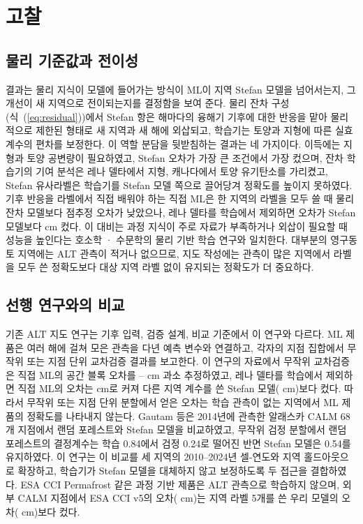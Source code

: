 \section{고찰}\label{sec:discussion}

\subsection{물리 기준값과 전이성}
결과는 물리 지식이 모델에 들어가는 방식이 ML이 지역 Stefan 모델을 넘어서는지, 그 개선이 새 지역으로 전이되는지를 결정함을 보여 준다. 물리 잔차 구성(식~(\ref{eq:residual}))에서 Stefan 항은 해마다의 융해기 기후에 대한 반응을 맡아 물리적으로 제한된 형태로 새 지역과 새 해에 외삽되고, 학습기는 토양과 지형에 따른 실효 계수의 편차를 보정한다. 이 역할 분담을 뒷받침하는 결과는 네 가지이다. 이득에는 지형과 토양 공변량이 필요하였고, Stefan 오차가 가장 큰 조건에서 가장 컸으며, 잔차 학습기의 기여 분석은 레나 델타에서 지형, 캐나다에서 토양 유기탄소를 가리켰고, Stefan 유사라벨은 학습기를 Stefan 모델 쪽으로 끌어당겨 정확도를 높이지 못하였다. 기후 반응을 라벨에서 직접 배워야 하는 직접 ML은 한 지역의 라벨을 모두 쓸 때 물리 잔차 모델보다 점추정 오차가 낮았으나, 레나 델타를 학습에서 제외하면 오차가 Stefan 모델보다 \ndrefLeregDzabs{} cm 컸다. 이 대비는 과정 지식이 주로 자료가 부족하거나 외삽이 필요할 때 성능을 높인다는 호소학 · 수문학의 물리 기반 학습 연구와 일치한다\cite{Read2019,Jia2021,Willard2022}. 대부분의 영구동토 지역에는 ALT 관측이 적거나 없으므로, 지도 작성에는 관측이 많은 지역에서 라벨을 모두 쓴 정확도보다 대상 지역 라벨 없이 유지되는 정확도가 더 중요하다.

\subsection{선행 연구와의 비교}
기존 ALT 지도 연구는 기후 입력, 검증 설계, 비교 기준에서 이 연구와 다르다. ML 제품은 여러 해에 걸쳐 모은 관측을 다년 예측 변수와 연결하고, 각자의 지점 집합에서 무작위 또는 지점 단위 교차검증 결과를 보고한다\cite{Ran2022a,Liu2024,Wei2026}. 이 연구의 자료에서 무작위 교차검증은 직접 ML의 공간 블록 오차를 \noptimLeDz--\noptimCaDz{} cm 과소 추정하였고, 레나 델타를 학습에서 제외하면 직접 ML의 오차는 \nrmseLeregDz{} cm로 커져 다른 지역 계수를 쓴 Stefan 모델(\nrmseLeregPz{} cm)보다 컸다. 따라서 무작위 또는 지점 단위 분할에서 얻은 오차는 학습 관측이 없는 지역에서 ML 제품의 정확도를 나타내지 않는다. Gautam 등\cite{Gautam2025}은 2014년에 관측한 알래스카 CALM 68개 지점에서 랜덤 포레스트와 Stefan 모델을 비교하였고, 무작위 검정 분할에서 랜덤 포레스트의 결정계수는 학습 0.84에서 검정 0.24로 떨어진 반면 Stefan 모델은 0.54를 유지하였다. 이 연구는 이 비교를 세 지역의 2010--2024년 셀-연도와 지역 홀드아웃으로 확장하고, 학습기가 Stefan 모델을 대체하지 않고 보정하도록 두 접근을 결합하였다. ESA CCI Permafrost 같은 과정 기반 제품은 ALT 관측으로 학습하지 않으며\cite{Westermann2024,Westermann2025}, 외부 CALM 지점에서 ESA CCI v5의 오차(\nftAllCcifivezero{} cm)는 지역 라벨 5개를 쓴 우리 모델의 오차(\nftAllRsfive{} cm)보다 컸다.

